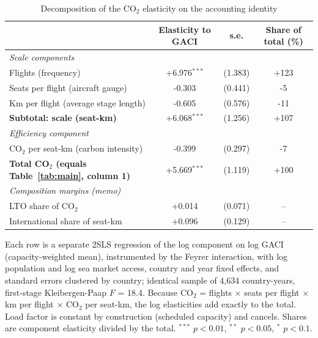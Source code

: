 \documentclass[12pt]{article}
\begin{document}
\begin{table}[htbp]
\centering
\begin{threeparttable}
\caption{Decomposition of the CO$_2$ elasticity on the accounting identity}
\label{tab:decomp}
\footnotesize
\begin{tabular}{lccc}
\toprule
 & Elasticity to GACI & s.e. & Share of total (\%) \\
\midrule
\multicolumn{4}{l}{\textit{Scale components}} \\
  Flights (frequency) & +6.976$^{***}$ & (1.383) & +123 \\
  Seats per flight (aircraft gauge) & -0.303 & (0.441) & -5 \\
  Km per flight (average stage length) & -0.605 & (0.576) & -11 \\
  \textbf{Subtotal: scale (seat-km)} & +6.068$^{***}$ & (1.256) & +107 \\
\multicolumn{4}{l}{\textit{Efficiency component}} \\
  CO$_2$ per seat-km (carbon intensity) & -0.399 & (0.297) & -7 \\
\midrule
  \textbf{Total CO$_2$ (equals Table~\ref{tab:main}, column 1)} & +5.669$^{***}$ & (1.119) & +100 \\
\midrule
\multicolumn{4}{l}{\textit{Composition margins (memo)}} \\
  LTO share of CO$_2$ & +0.014 & (0.071) & -- \\
  International share of seat-km & +0.096 & (0.129) & -- \\
\bottomrule
\end{tabular}
\begin{tablenotes}\footnotesize
\item Each row is a separate 2SLS regression of the log component on log GACI (capacity-weighted mean), instrumented by the Feyrer interaction, with log population and log sea market access, country and year fixed effects, and standard errors clustered by country; identical sample of 4,634 country-years, first-stage Kleibergen-Paap $F$ = 18.4. Because CO$_2$ = flights $\times$ seats per flight $\times$ km per flight $\times$ CO$_2$ per seat-km, the log elasticities add exactly to the total. Load factor is constant by construction (scheduled capacity) and cancels. Shares are component elasticity divided by the total. $^{***}$ $p<0.01$, $^{**}$ $p<0.05$, $^{*}$ $p<0.1$.
\end{tablenotes}
\end{threeparttable}
\end{table}
\end{document}
